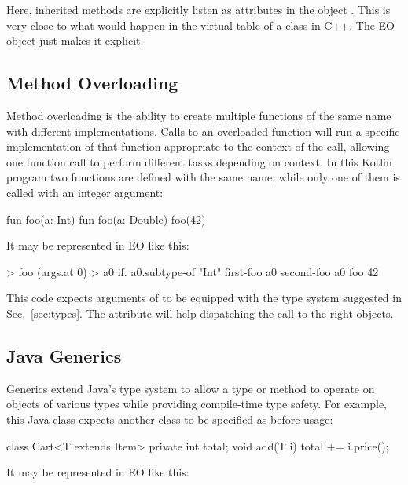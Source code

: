 \documentclass[sigplan,11pt,nonacm,natbib=false]{acmart}
\begin{document}
Here, inherited methods are explicitly listen as attributes in the object . This is very close to what would happen in the virtual table of a class  in C++. The EO object  just makes it explicit.

\subsection{Method Overloading}
\label{sec:overloading}

Method overloading is the ability to create multiple functions of the same name with different implementations. Calls to an overloaded function will run a specific implementation of that function appropriate to the context of the call, allowing one function call to perform different tasks depending on context. In this Kotlin program two functions are defined with the same name, while only one of them is called with an integer argument:

\begin{ffcode}
fun foo(a: Int) {}
fun foo(a: Double) {}
foo(42)
\end{ffcode}

It may be represented in EO like this:

\begin{ffcode}
[args...] > foo
  (args.at 0) > a0
  if.
    a0.subtype-of "Int"
    first-foo a0
    second-foo a0
foo 42
\end{ffcode}

This code expects arguments of  to be equipped with the type system suggested in Sec.~\ref{sec:types}. The attribute  will help dispatching the call to the right objects.

\subsection{Java Generics}
\label{sec:generics}

Generics extend Java's type system to allow a type or method to operate on objects of various types while providing compile-time type safety. For example, this Java class expects another class to be specified as  before usage: 

\begin{ffcode}
class Cart<T extends Item> {
  private int total;
  void add(T i) {
    total += i.price();
  }
} 
\end{ffcode}

It may be represented in EO like this:
\end{document}
